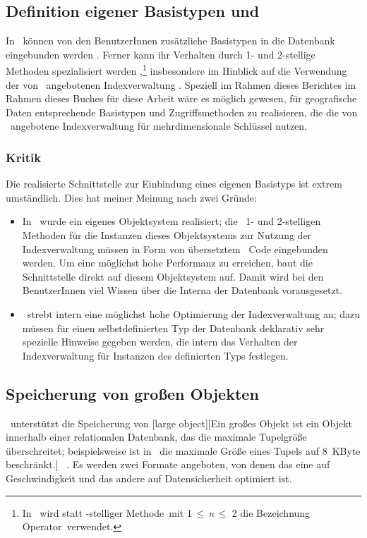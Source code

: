 \subsection{Definition eigener Basistypen und \protect\spc[r]
\protect\mtd[n]}
%
In \postgres\ k\"{o}nnen von den BenutzerInnen zus\"{a}tzliche
Basistypen in die Datenbank eingebunden werden
\cite[]{bib:rh93} \cite[]{bib:we93}
\cite{bib:sto86b}. Ferner kann ihr Verhalten durch 1- und 2-stellige
Methoden spezialisiert werden
\cite[]{bib:we93},\footnote{In \postgres\ wird statt
  -stelliger Methode\rgrq\ mit 1\,$\leq$\,{\it n}\,$\leq$
  2 die Bezeichnung \rglq{}Operator\rgrq\ verwendet.} insbesondere im
Hinblick auf die Verwendung der von \postgres\ angebotenen
Indexverwaltung \cite[]{bib:rh93}. Speziell
\ifbericht im Rahmen dieses Berichtes \else\ifbuch im Rahmen dieses
Buches \else f\"{u}r diese Arbeit \fi\fi w\"{a}re es m\"{o}glich
gewesen, f\"{u}r geografische Daten entsprechende Basistypen und
Zugriffsmethoden zu realisieren, die die von \postgres\ angebotene
Indexverwaltung f\"{u}r mehrdimensionale Schl\"{u}ssel nutzen.
%
\subsubsection{Kritik}
%
Die realisierte Schnittstelle zur Einbindung eines eigenen Basistyps
ist extrem umst\"{a}ndlich. Dies hat meiner Meinung nach zwei Gr\"{u}nde:
\begin{itemize}
%
\item In \postgres\ wurde ein eigenes Objektsystem realisiert;
die \og[en]\ 1- und 2-stelligen Methoden f\"{u}r die Instanzen dieses
Objektsystems zur Nutzung der Indexverwaltung 
m\"{u}ssen in Form von \"{u}bersetztem \clogo\ Code eingebunden werden. Um
eine m\"{o}glichst hohe Performanz zu erreichen, baut die Schnittstelle
direkt auf diesem Objektsystem auf. Damit wird bei den BenutzerInnen
viel Wissen \"{u}ber die Interna der Datenbank vorausgesetzt.
%
\item \postgres\ strebt intern eine m\"{o}glichst hohe Optimierung der
Indexverwaltung an; dazu m\"{u}ssen f\"{u}r einen selbstdefinierten Typ
der Datenbank deklarativ sehr spezielle Hinweise gegeben werden, die
intern das Verhalten der Indexverwaltung f\"{u}r Instanzen des
definierten Typs festlegen.
%
\end{itemize}
%
\subsection{Speicherung von gro\ss{}en Objekten}%
%
\postore\ unterst\"{u}tzt die Speicherung von %
[large object][Ein gro\ss{}es Objekt ist ein
Objekt innerhalb einer relationalen Datenbank, das die maximale
Tupelgr\"{o}\ss{}e \"{u}berschreitet; beispielsweise ist in
\protect\postgres\ die maximale Gr\"{o}\ss{}e eines Tupels auf 8~KByte
beschr\"{a}nkt.]\ \cite[]{bib:rh93}
\cite[]{bib:we93}. Es werden zwei Formate
angeboten, von denen das eine auf Geschwindigkeit und das andere auf
Datensicherheit optimiert ist.
%
